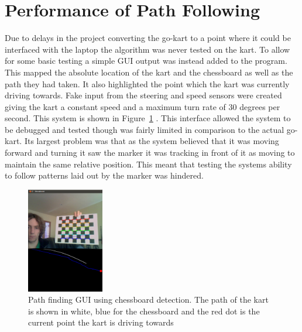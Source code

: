 \section{Performance of Path Following}

Due to delays in the project converting the go-kart to a point where it could be interfaced with the laptop the algorithm was never tested on the kart. To allow for some basic testing a simple GUI output was instead added to the program. This mapped the absolute location of the kart and the chessboard as well as the path they had taken. It also highlighted the point which the kart was currently driving towards. Fake input from the steering and speed sensors were created giving the kart a constant speed and a maximum turn rate of 30 degrees per second. This system is shown in Figure~\ref{tracking} . This interface allowed the system to be debugged and tested though was fairly limited in comparison to the actual go-kart. Its largest problem was that as the system believed that it was moving forward and turning it saw the marker it was tracking in front of it as moving to maintain the same relative position. This meant that testing the systems ability to follow patterns laid out by the marker was hindered.

\begin{figure}[ht]
	\begin{center}
		\includegraphics[width=0.3\textwidth]{tracking}
	\end{center}
	\caption{Path finding GUI using chessboard detection. The path of the kart is shown in white, blue for the chessboard and the red dot is the current point the kart is driving towards}
	\label{tracking}
\end{figure}